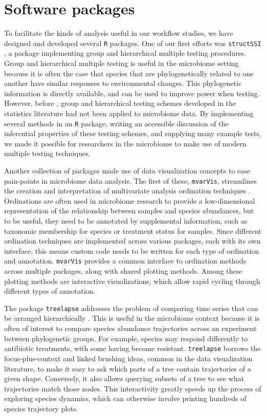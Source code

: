 \documentclass{article}
\begin{document}
\section{Software packages}

To facilitate the kinds of analysis useful in our workflow studies, we have
designed and developed several \texttt{R} packages. One of our first efforts was
\texttt{structSSI} \citep{sankaran2014structssi}, a package implementing group
and hierarchical multiple testing procedures. Group and hierarchical multiple
testing is useful in the microbiome setting because it is often the case that
species that are phylogenetically related to one another have similar responses
to environmental changes. This phylogenetic information is directly available,
and can be used to improve power when testing. However, before
\citep{sankaran2014structssi}, group and hierarchical testing schemes developed
in the statistics literature had not been applied to microbiome data. By
implementing several methods in an \texttt{R} package, writing an accessible
discussion of the inferential properties of these testing schemes, and supplying
many example tests, we made it possible for researchers in the microbiome to
make use of modern multiple testing techniques.

Another collection of packages made use of data visualization concepts to ease
pain-points in microbiome data analysis. The first of these, \texttt{mvarVis},
streamlines the creation and interpretation of multivariate analysis ordination
techniques \citep{mvarvis}. Ordinations are often used in microbiome research to
provide a low-dimensional representation of the relationship between samples and
species abundances, but to be useful, they need to be annotated by supplemental
information, such as taxonomic membership for species or treatment status for
samples. Since different ordination techniques are implemented across various
packages, each with its own interface, this means custom code needs to be
written for each type of ordination and annotation. \texttt{mvarVis} provides a
common interface to ordination methods across multiple packages, along with
shared plotting methods. Among these plotting methods are interactive
visualizations, which allow rapid cycling through different types of annotation.

The package \texttt{treelapse} addresses the problem of comparing time series
that can be arranged hierarchically \citep{Sankaran2017}. This is useful in the
microbiome context because it is often of interest to compare species abundance
trajectories across an experiment between phylogenetic groups. For example,
species may respond differently to antibiotic treatments, with some having
become resistant. \texttt{treelapse} borrows the focus-plus-context and linked
brushing ideas, common in the data visualization literature, to make it easy to
ask which parts of a tree contain trajectories of a given shape. Conversely, it
also allows querying subsets of a tree to see what trajectories match those
nodes. This interactivity greatly speeds up the process of exploring species
dynamics, which can otherwise involve printing hundreds of species trajectory
plots.
\end{document}
